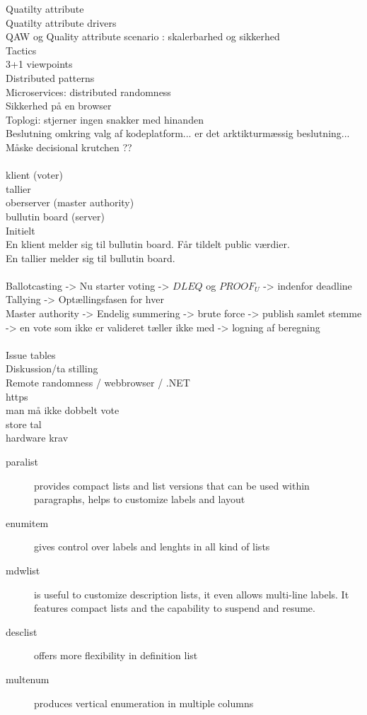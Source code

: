 \documentclass{article}
\begin{document}
\noindent
Quatilty attribute\\
Quatilty attribute drivers\\
QAW og Quality attribute scenario : skalerbarhed og sikkerhed\\
Tactics\\
3+1 viewpoints\\
Distributed patterns\\
Microservices: distributed randomness\\
Sikkerhed på en browser\\
Toplogi: stjerner ingen snakker med hinanden\\
Beslutning omkring valg af kodeplatform... er det arktikturmæssig beslutning... Måske decisional krutchen ??\\\\

\noindent
klient (voter)\\
tallier\\
oberserver (master authority)\\
bullutin board (server)\\
\noindent
Initielt\\
En klient melder sig til bullutin board. Får tildelt public værdier. \\
En tallier melder sig til bullutin board. \\\\
\noindent
Ballotcasting -> Nu starter voting ->  $DLEQ$ og $PROOF_U$ -> indenfor deadline\\
Tallying -> Optællingsfasen for hver \\
Master authority -> Endelig summering -> brute force -> publish samlet stemme -> en vote som ikke er valideret tæller ikke med -> logning af beregning \\\\

\noindent
Issue tables\\
Diskussion/ta stilling \\
Remote randomness / webbrowser / .NET\\
https\\
man må ikke dobbelt vote\\
store tal\\
hardware krav


\begin{description}
  \item[paralist] provides compact lists and list versions
    that can be used within paragraphs, helps to customize
    labels and layout
  \item[enumitem] gives control over labels and lenghts in all
    kind of lists
  \item[mdwlist] is useful to customize description lists,
    it even allows multi-line labels. It features compact lists
    and the capability to suspend and resume.
  \item[desclist] offers more flexibility in definition list
  \item[multenum] produces vertical enumeration in
    multiple columns
\end{description}
\end{document}
